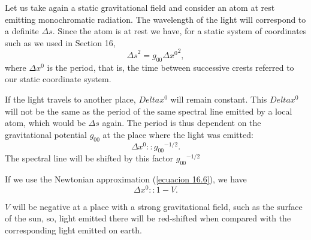 Let us take again a static gravitational field and consider an atom at rest emitting monochromatic radiation. The 
wavelength of the light will correspond to a definite $\Delta s$. Since the atom is at rest we have, for a static 
system of coordinates such as we used in Section 16,
\[
    {\Delta s}^2 = g_{00}{\Delta x^0}^2,
\]
where $\Delta x^0$ is the period, that is, the time between successive crests referred to our static coordinate system.

If the light travels to another place, $Delta x^0$ will remain constant. This $Delta x^0$ will not be the same as the 
period of the same spectral line emitted by a local atom, which would be $\Delta s$ again. The period is thus dependent 
on the gravitational potential $g_{00}$ at the place where the light was emitted:
\[
    \Delta x^0 :: {g_{00}}^{-1/2}.
\]
The spectral line will be shifted by this factor ${g_{00}}^{-1/2}$

If we use the Newtonian approximation (\ref{ecuacion 16.6}), we have 
\[
    \Delta x^0 :: 1 - V.
\]

$V$ will be negative at a place with a strong gravitational field, such as the surface of the sun, so, light emitted 
there will be red-shifted when compared with the corresponding light emitted on earth.
